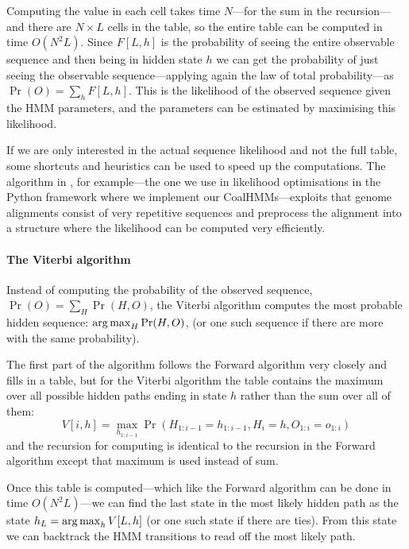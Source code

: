 Computing the value in each cell takes time $N$---for the sum in the recursion---and there are $N\times L$ cells in the table, so the entire table can be computed in time $O(N^2L)$. Since $F[L,h]$ is the probability of seeing the entire observable sequence and then being in hidden state $h$ we can get the probability of just seeing the observable sequence---applying again the law of total probability---as $\Pr(O)=\sum_h F[L,h]$. This is the likelihood of the observed sequence given the HMM parameters, and the parameters can be estimated by maximising this likelihood.

If we are only interested in the actual sequence likelihood and not the full table, some shortcuts and heuristics can be used to speed up the computations. The algorithm in \citet{Sand:2013bi}, for example---the one we use in likelihood optimisations in the Python framework where we implement our CoalHMMs---exploits that genome alignments consist of very repetitive sequences and preprocess the alignment into a structure where the likelihood can be computed very efficiently.


\paragraph{The Viterbi algorithm}

Instead of computing the probability of the observed sequence, $\Pr(O)=\sum_{H}\Pr(H,O)$, the Viterbi algorithm computes the most probable hidden sequence: $\operatorname*{arg\,max}_H \Pr(H,O)$, (or one such sequence if there are more with the same probability).

The first part of the algorithm follows the Forward algorithm very closely and fills in a table, but for the Viterbi algorithm the table contains the maximum over all possible hidden paths ending in state $h$ rather than the sum over all of them:
\begin{displaymath}
  V[i,h] = 
  \max_{h_{1:i-1}} \Pr\left(H_{1:i-1}=h_{1:i-1}, H_i=h, O_{1:i}=o_{1:i}\right)
\end{displaymath}
and the recursion for computing is identical to the recursion in the Forward algorithm except that maximum is used instead of sum.

Once this table is computed---which like the Forward algorithm can be done in time $O(N^2L)$---we can find the last state in the most likely hidden path as the state $h_L = \operatorname*{arg\,max}_h V[L,h]$ (or one such state if there are ties). From this state we can backtrack the HMM transitions to read off the most likely path.

